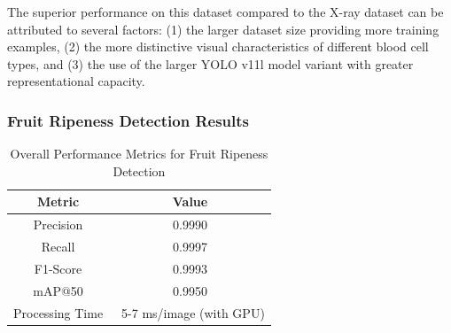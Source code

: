 \begin{multicols}{2}
The superior performance on this dataset compared to the X-ray dataset can be attributed to several factors: (1) the larger dataset size providing more training examples, (2) the more distinctive visual characteristics of different blood cell types, and (3) the use of the larger YOLO v11l model variant with greater representational capacity.
\end{multicols}

\subsubsection{Fruit Ripeness Detection Results}

\begin{table}[ht]
\centering
\begin{tabular}{|c|c|}
\hline
\textbf{Metric} & \textbf{Value} \\
\hline
Precision & 0.9990 \\
Recall & 0.9997 \\
F1-Score & 0.9993 \\
mAP@50 & 0.9950 \\
Processing Time & ~5-7 ms/image (with GPU) \\
\hline
\end{tabular}
\caption{Overall Performance Metrics for Fruit Ripeness Detection}
\label{tab:fruit_results}
\end{table}


